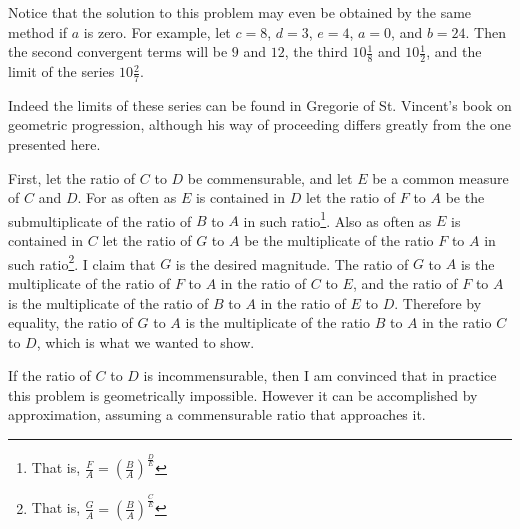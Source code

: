\documentclass[11pt,letterpaper]{book}
\begin{document}
Notice that the solution to this problem may even be obtained by the same
method if $a$ is zero. For example, let $c = 8$, $d = 3$, $e
= 4$, $a = 0$, and $b = 24$. Then the second convergent terms will be $9$ and
$12$, the third $10\frac{1}{8}$ and $10\frac{1}{2}$, and the limit of the series
$10\frac{2}{7}$.

Indeed the limits of these series can be found in Gregorie of St. Vincent's book
on geometric progression, although his way of proceeding differs greatly from
the one presented here.

\newpage
{}

First, let the ratio of $C$ to $D$ be commensurable, and let $E$ be a common
measure of $C$ and $D$. For as often as $E$ is contained in $D$ let the ratio of
$F$ to $A$ be the submultiplicate of the ratio of $B$ to $A$ in such
ratio\footnote{That is, $\frac{F}{A} =
\left(\frac{B}{A}\right)^{\frac{D}{E}}$}. Also as often as $E$ is contained in
$C$ let the ratio of $G$ to $A$ be the multiplicate of the ratio $F$ to $A$ in
such ratio\footnote{That is, $\frac{G}{A} =
\left(\frac{B}{A}\right)^{\frac{C}{E}}$}.
I claim that $G$ is the desired magnitude. The ratio of $G$ to $A$ is the
multiplicate of the ratio of $F$ to $A$ in the ratio of $C$ to $E$, and the
ratio of $F$ to $A$ is the multiplicate of the ratio of $B$ to $A$ in the ratio
of $E$ to $D$.
Therefore by equality, the ratio of $G$ to $A$ is the multiplicate of the ratio
$B$ to $A$ in the ratio $C$ to $D$, which is what we wanted to show.

If the ratio of $C$ to $D$ is incommensurable, then I am convinced that in
practice this problem is geometrically impossible. However it can be
accomplished by approximation, assuming a commensurable ratio that approaches
it.
\end{document}
